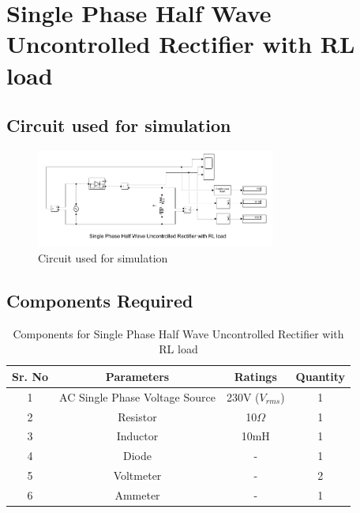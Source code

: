 \section{Single Phase Half Wave Uncontrolled Rectifier with RL load}

\subsection{Circuit used for simulation}

\begin{figure}[h]
    \centering
    \includegraphics[width=0.7\textwidth]{images/experiment-1/circuit-diagram-simulation-02.png}
    \caption{Circuit used for simulation}
    \label{Fig_simulation_circuit_single-phase-half-wave-uncontrolled-rectifier-with-RL-load}
\end{figure}

\subsection{Components Required}

\begin{table}[h]
    \renewcommand{\arraystretch}{1.3}
    \label{table_components_required_circuit_2}
    \centering
    \begin{tabular}{|c|c|c|c|}
        \hline
        Sr. No & Parameters                     & Ratings            & Quantity \\
        \hline
        \hline
        1      & AC Single Phase Voltage Source & 230V ($ V_{rms} $) & 1        \\
        \hline
        2      & Resistor                       & 10$ \Omega $       & 1        \\
        \hline
        3      & Inductor                       & 10mH               & 1        \\
        \hline
        4      & Diode                          & -                  & 1        \\
        \hline
        5      & Voltmeter                      & -                  & 2        \\
        \hline
        6      & Ammeter                        & -                  & 1        \\
        \hline
    \end{tabular}
    \caption{Components for Single Phase Half Wave Uncontrolled Rectifier with RL load}
\end{table}



